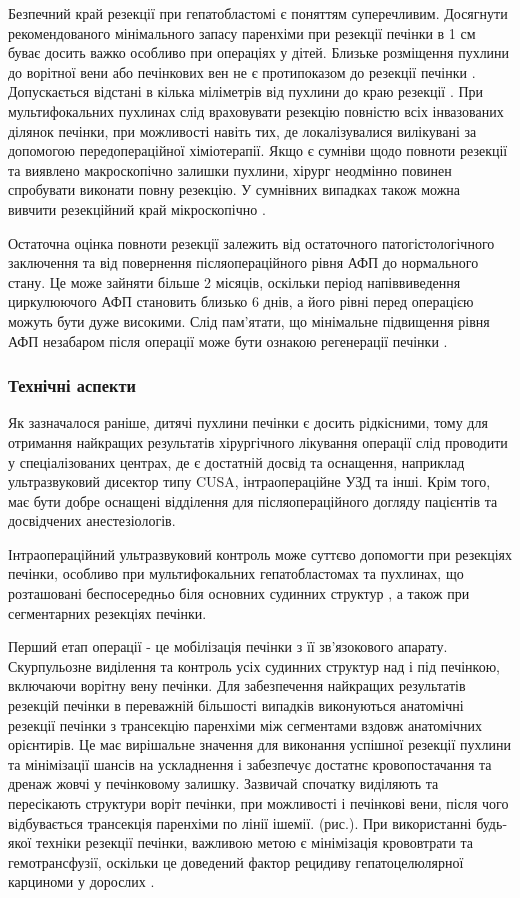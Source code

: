 Безпечний край резекції при гепатобластомі є поняттям суперечливим. Досягнути рекомендованого мінімального запасу паренхіми при резекції печінки в 1 см буває досить важко особливо при операціях у дітей. Близьке розміщення пухлини до ворітної вени або печінкових вен не є протипоказом до резекції печінки \cite{pmid31931965}. Допускається відстані в кілька міліметрів від пухлини до краю резекції \cite{pmid32181433}. При мультифокальних пухлинах слід враховувати резекцію повністю всіх інвазованих ділянок печінки, при можливості навіть тих, де локалізувалися вилікувані за допомогою передопераційної хіміотерапії. Якщо є сумніви щодо повноти резекції та виявлено макроскопічно залишки пухлини, хірург неодмінно повинен спробувати виконати повну резекцію. У сумнівних випадках також можна вивчити резекційний край мікроскопічно \cite{pmid32421442}. 

Остаточна оцінка повноти резекції залежить від остаточного патогістологічного заключення та від повернення післяопераційного рівня АФП до нормального стану. Це може зайняти більше 2 місяців, оскільки період напіввиведення циркулюючого АФП становить близько 6 днів, а його рівні перед операцією можуть бути дуже високими. Слід пам’ятати, що мінімальне підвищення рівня АФП незабаром після операції може бути ознакою регенерації печінки \cite{pmid32458263}.
\subsubsection{Технічні аспекти}
Як зазначалося раніше, дитячі пухлини печінки є досить рідкісними, тому для отримання найкращих результатів хірургічного лікування операції слід проводити у спеціалізованих центрах, де є достатній досвід та оснащення, наприклад ультразвуковий дисектор типу CUSA, інтраопераційне УЗД та інші. Крім того, має бути добре оснащені відділення для післяопераційного догляду пацієнтів та досвідчених анестезіологів. 

Інтраопераційний ультразвуковий контроль може суттєво допомогти при резекціях печінки, особливо при мультифокальних гепатобластомах та пухлинах, що розташовані беспосередньо біля основних судинних структур \cite{pmid32603027}, а також при сегментарних резекціях печінки. 

Перший етап операції - це мобілізація печінки з її зв’язокового апарату. Скурпульозне виділення та контроль усіх судинних структур над і під печінкою, включаючи ворітну вену печінки. Для забезпечення найкращих результатів резекцій печінки в переважній більшості випадків виконуються анатомічні резекції печінки з трансекцію паренхіми між сегментами вздовж анатомічних орієнтирів. Це має вирішальне значення для виконання успішної резекції пухлини та мінімізації шансів на ускладнення і забезпечує достатнє кровопостачання та дренаж жовчі у печінковому залишку. Зазвичай спочатку виділяють та пересікають структури воріт печінки, при можливості і печінкові вени, після чого відбувається трансекція паренхіми по лінії ішемії. (рис.). При використанні будь-якої техніки резекції печінки, важливою метою є мінімізація крововтрати та гемотрансфузії, оскільки це доведений фактор рецидиву гепатоцелюлярної карциноми у дорослих \cite{pmid32843604}. 

